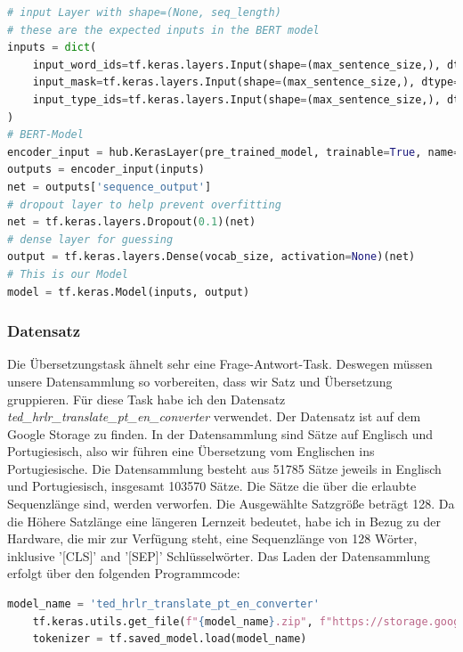 \begin{lstlisting}[language=Python, label=BERT_Definition, caption={Definition des BERT-Models zur Anpassung}]
# input Layer with shape=(None, seq_length)
# these are the expected inputs in the BERT model
inputs = dict(
	input_word_ids=tf.keras.layers.Input(shape=(max_sentence_size,), dtype=tf.int32),
	input_mask=tf.keras.layers.Input(shape=(max_sentence_size,), dtype=tf.int32),
	input_type_ids=tf.keras.layers.Input(shape=(max_sentence_size,), dtype=tf.int32)
)
# BERT-Model
encoder_input = hub.KerasLayer(pre_trained_model, trainable=True, name="BERT_Encoder")
outputs = encoder_input(inputs)
net = outputs['sequence_output']
# dropout layer to help prevent overfitting
net = tf.keras.layers.Dropout(0.1)(net)
# dense layer for guessing
output = tf.keras.layers.Dense(vocab_size, activation=None)(net)
# This is our Model
model = tf.keras.Model(inputs, output)
\end{lstlisting}

\subsubsection{Datensatz}
Die Übersetzungstask ähnelt sehr eine Frage-Antwort-Task. Deswegen müssen unsere Datensammlung so vorbereiten, dass wir Satz und Übersetzung gruppieren. Für diese Task habe ich den Datensatz \textit{ted\_hrlr\_translate\_pt\_en\_converter} verwendet. Der Datensatz ist auf dem Google Storage zu finden. In der Datensammlung sind Sätze auf Englisch und Portugiesisch, also wir führen eine Übersetzung vom Englischen ins Portugiesische. Die Datensammlung besteht aus 51785 Sätze jeweils in Englisch und Portugiesisch, insgesamt 103570 Sätze. Die Sätze die über die erlaubte Sequenzlänge sind, werden verworfen. Die Ausgewählte Satzgröße beträgt 128. Da die Höhere Satzlänge eine längeren Lernzeit bedeutet, habe ich in Bezug zu der Hardware, die mir zur Verfügung steht, eine Sequenzlänge von 128 Wörter, inklusive '[CLS]' and '[SEP]' Schlüsselwörter. Das Laden der Datensammlung erfolgt über den folgenden Programmcode:

\begin{lstlisting}[language=Python, caption={Laden der Trainingsdaten}]
	model_name = 'ted_hrlr_translate_pt_en_converter'
	tf.keras.utils.get_file(f"{model_name}.zip", f"https://storage.googleapis.com/download.tensorflow.org/models/{model_name}.zip", cache_dir='.', cache_subdir='', extract=True)
	tokenizer = tf.saved_model.load(model_name)
\end{lstlisting}

